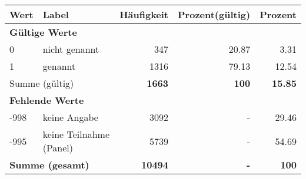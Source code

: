      \begin{longtable}{lXrrr}
     \toprule
     \textbf{Wert} & \textbf{Label} & \textbf{Häufigkeit} & \textbf{Prozent(gültig)} & \textbf{Prozent} \\
     \endhead
     \midrule
     \multicolumn{5}{l}{\textbf{Gültige Werte}}\\

     0 &
     \multicolumn{1}{X}{ nicht genannt   } &


       \num{347} &
       \num[round-mode=places,round-precision=2]{20,87} &
         \num[round-mode=places,round-precision=2]{3,31} \\

     1 &
     \multicolumn{1}{X}{ genannt   } &


       \num{1316} &
       \num[round-mode=places,round-precision=2]{79,13} &
         \num[round-mode=places,round-precision=2]{12,54} \\
     \midrule
     \multicolumn{2}{l}{Summe (gültig)} &
       \textbf{\num{1663}} &
     \textbf{100} &
       \textbf{\num[round-mode=places,round-precision=2]{15,85}} \\
     \multicolumn{5}{l}{\textbf{Fehlende Werte}}\\
       -998 &
       keine Angabe &
         \num{3092} &
        - &
         \num[round-mode=places,round-precision=2]{29,46} \\
       -995 &
       keine Teilnahme (Panel) &
         \num{5739} &
        - &
         \num[round-mode=places,round-precision=2]{54,69} \\
     \midrule
     \multicolumn{2}{l}{\textbf{Summe (gesamt)}} &
          \textbf{\num{10494}} &
        \textbf{-} &
        \textbf{100} \\
     \bottomrule
     \end{longtable}
     
